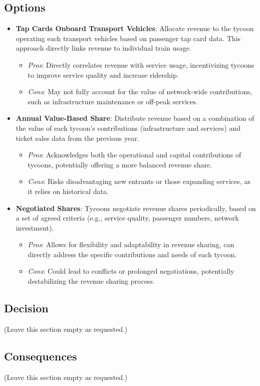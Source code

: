 \subsection*{Options}
\begin{itemize}
    \item \textbf{Tap Cards Onboard Transport Vehicles}: Allocate revenue to the tycoon operating each transport vehicles based on passenger tap card data. This approach directly links revenue to individual train usage.
    \begin{itemize}
        \item \textit{Pros}: Directly correlates revenue with service usage, incentivizing tycoons to improve service quality and increase ridership.
        \item \textit{Cons}: May not fully account for the value of network-wide contributions, such as infrastructure maintenance or off-peak services.
    \end{itemize}
    \item \textbf{Annual Value-Based Share}: Distribute revenue based on a combination of the value of each tycoon's contributions (infrastructure and services) and ticket sales data from the previous year.
    \begin{itemize}
        \item \textit{Pros}: Acknowledges both the operational and capital contributions of tycoons, potentially offering a more balanced revenue share.
        \item \textit{Cons}: Risks disadvantaging new entrants or those expanding services, as it relies on historical data.
    \end{itemize}
    \item \textbf{Negotiated Shares}: Tycoons negotiate revenue shares periodically, based on a set of agreed criteria (e.g., service quality, passenger numbers, network investment).
    \begin{itemize}
        \item \textit{Pros}: Allows for flexibility and adaptability in revenue sharing, can directly address the specific contributions and needs of each tycoon.
        \item \textit{Cons}: Could lead to conflicts or prolonged negotiations, potentially destabilizing the revenue sharing process.
    \end{itemize}
\end{itemize}

\subsection*{Decision}
(Leave this section empty as requested.)

\subsection*{Consequences}
(Leave this section empty as requested.)